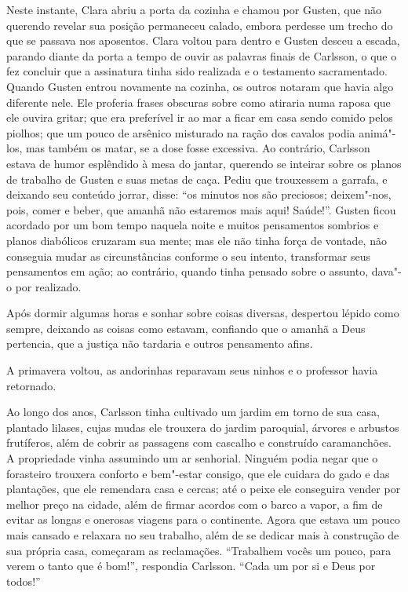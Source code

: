 Neste instante, Clara abriu a porta da cozinha e chamou por Gusten, que não
querendo revelar sua posição permaneceu calado, embora perdesse um trecho do que
se passava nos aposentos. Clara voltou para dentro e Gusten desceu a escada,
parando diante da porta a tempo de ouvir as palavras finais de Carlsson, o que o
fez concluir que a assinatura tinha sido realizada e o testamento sacramentado.
Quando Gusten entrou novamente na cozinha, os outros notaram que havia algo
diferente nele. Ele proferia frases obscuras sobre como atiraria numa raposa que
ele ouvira gritar; que era preferível ir ao mar a ficar em casa sendo comido
pelos piolhos; que um pouco de arsênico misturado na ração dos cavalos podia
animá"-los, mas também os matar, se a dose fosse excessiva. Ao contrário,
Carlsson estava de humor esplêndido à mesa do jantar, querendo se inteirar sobre
os planos de trabalho de Gusten e suas metas de caça. Pediu que
trouxessem a garrafa, e deixando seu conteúdo jorrar, disse: ``os
minutos nos são preciosos; deixem"-nos, pois, comer e beber, que amanhã não
estaremos mais aqui! Saúde!''. Gusten ficou acordado por um bom tempo naquela
noite e muitos pensamentos sombrios e planos diabólicos cruzaram sua mente; mas ele
não tinha força de vontade, não conseguia mudar as circunstâncias conforme o seu intento,
transformar seus pensamentos em ação; ao contrário, quando tinha pensado sobre o assunto,
dava"-o por realizado.

 Após dormir algumas horas e sonhar sobre coisas diversas, 
 despertou lépido como sempre, deixando as coisas como estavam, confiando que o
 amanhã a Deus pertencia, que a justiça não tardaria e outros pensamento afins.

 A primavera voltou, as andorinhas reparavam seus ninhos e o professor havia retornado.

Ao longo dos anos, Carlsson tinha cultivado um jardim em torno de sua casa,
plantado lilases, cujas mudas ele trouxera do jardim paroquial, árvores e arbustos 
frutíferos, além de cobrir as passagens com cascalho e construído
caramanchões. A propriedade vinha assumindo um ar senhorial. Ninguém podia
negar que o forasteiro trouxera conforto e bem"-estar consigo, que ele cuidara do
gado e das plantações, que ele remendara casa e cercas; até o peixe ele conseguira
vender por melhor preço na cidade, além de firmar acordos com o barco a vapor, a
fim de evitar as longas e onerosas viagens para o continente. Agora que
estava um pouco mais cansado e relaxara no seu trabalho, além de se dedicar mais
à construção de sua própria casa, começaram as reclamações. ``Trabalhem vocês
um pouco, para verem o tanto que é bom!'', respondia Carlsson. ``Cada um por si e
Deus por todos!''

